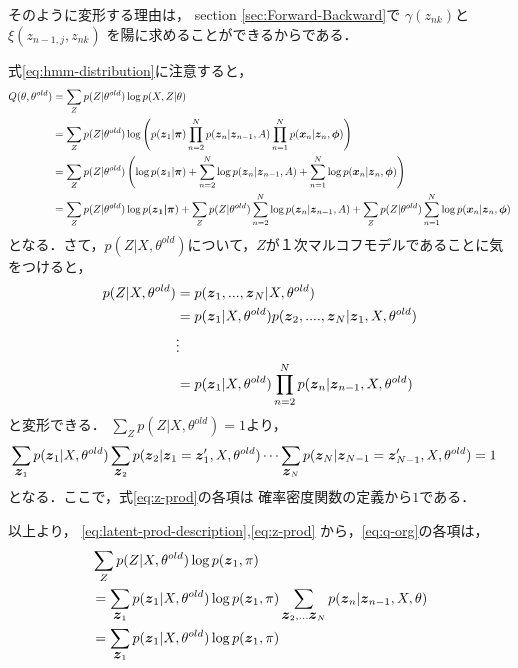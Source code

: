 そのように変形する理由は，
section \ref{sec:Forward-Backward}で
$\gamma(z_{nk})$と$\xi(z_{n-1,j},z_{nk})$
を陽に求めることができるからである．

式\eqref{eq:hmm-distribution}に注意すると，
\begin{align}
    Q(\theta, \theta^{old})& =  \sum_Zp(Z| \theta^{old})\log p(X, Z| \theta) \\
    & =  \sum_Zp(Z| \theta^{old})\log \left( p(\mbox{\boldmath $z$}_1| \mbox{\boldmath $\pi$})\prod_{n=2}^Np(\mbox{\boldmath $z$}_n|\mbox{\boldmath $z$}_{n-1},A)\prod_{n=1}^Np(\mbox{\boldmath $x$}_n|\mbox{\boldmath $z$}_n,\mbox{\boldmath $\phi$}) \right) \\
    & =  \sum_Zp(Z| \theta^{old})\left(\log p(\mbox{\boldmath $z$}_1|\mbox{\boldmath $\pi$}) + \sum_{n=2}^N\log p(\mbox{\boldmath $z$}_n|\mbox{\boldmath $z$}_{n-1},A) + \sum_{n=1}^N\log p(\mbox{\boldmath $x$}_n|\mbox{\boldmath $z$}_n,\mbox{\boldmath $\phi$})\right) \\
    & =  \sum_Zp(Z| \theta^{old})\log p(\mbox{\boldmath $\mbox{\boldmath $z$}_1|\mbox{\boldmath $\pi$}$}) + \sum_Zp(Z| \theta^{old})\sum_{n=2}^N\log p(\mbox{\boldmath $z$}_n|\mbox{\boldmath $z$}_{n-1},A) + \sum_Zp(Z| \theta^{old})\sum_{n=1}^N\log p(\mbox{\boldmath $x$}_n|\mbox{\boldmath $z$}_n,\mbox{\boldmath $\phi$}) \label{eq:q-org}
\end{align}
となる．さて，$p(Z|X,\theta^{old})$について，$Z$が１次マルコフモデルであることに気をつけると，
\begin{align}
  p(Z|X,\theta^{old}) &=  p(\mbox{\boldmath $z$}_1, ..., \mbox{\boldmath $z$}_N|X,\theta^{old}) \\
  &=  p(\mbox{\boldmath $z$}_1|X,\theta^{old})p(\mbox{\boldmath $z$}_2, ...., \mbox{\boldmath $z$}_N|\mbox{\boldmath $z$}_1,X, \theta^{old}) \\
  &\vdots \\
  &=  p(\mbox{\boldmath $z$}_1|X,\theta^{old})\prod_{n=2}^Np(\mbox{\boldmath $z$}_n|\mbox{\boldmath $z$}_{n-1},X,\theta^{old}) \label{eq:latent-prod-description}
\end{align}
と変形できる．
 $\sum_Zp(Z|X,\theta^{old}) = 1$より，
\begin{align}
  &\sum_{\mbox{\boldmath $z$}_1}p(\mbox{\boldmath $z$}_1|X,\theta^{old})\sum_{\mbox{\boldmath $z$}_2}p(\mbox{\boldmath $z$}_2|\mbox{\boldmath $z$}_1=\mbox{\boldmath $z$}_1',X,\theta^{old})\dots \sum_{\mbox{\boldmath $z$}_N}p(\mbox{\boldmath $z$}_N|\mbox{\boldmath $z$}_{N-1}=\mbox{\boldmath $z$}_{N-1}',X,\theta^{old}) = 1 \label{eq:z-prod}
\end{align}
となる．ここで，式\eqref{eq:z-prod}の各項は
確率密度関数の定義から$1$である．

以上より，
\eqref{eq:latent-prod-description},\eqref{eq:z-prod}
から，\eqref{eq:q-org}の各項は，
\begin{align}
  & \sum_Zp(Z|X,\theta^{old})\log p(\mbox{\boldmath $z$}_1,\pi) \\
  &= \sum_{\mbox{\boldmath $z$}_1}p(\mbox{\boldmath $z$}_1|X,\theta^{old})\log p(\mbox{\boldmath $z$}_1,\pi)\sum_{\mbox{\boldmath $z$}_2,\dots \mbox{\boldmath $z$}_N}p(\mbox{\boldmath $z$}_n|\mbox{\boldmath $z$}_{n-1},X,\theta) \\
  &= \sum_{\mbox{\boldmath $z$}_1}p(\mbox{\boldmath $z$}_1|X,\theta^{old})\log p(\mbox{\boldmath $z$}_1,\pi) \label{eq:initial}
\end{align}

